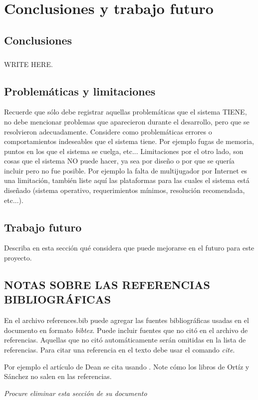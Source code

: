 \chapter{Conclusiones y trabajo futuro}
\section{Conclusiones}
\paragraph{}WRITE HERE.
\section{Problemáticas y limitaciones}
Recuerde que sólo debe registrar aquellas problemáticas que el sistema TIENE, no debe mencionar problemas que aparecieron durante el desarrollo, pero que se resolvieron adecuadamente.
Considere como problemáticas errores o comportamientos indeseables que el sistema tiene. Por ejemplo fugas de memoria, puntos en los que el sistema se cuelga, etc...
Limitaciones por el otro lado, son cosas que el sistema NO puede hacer, ya sea por diseño o por que se quería incluir pero no fue posible. Por ejemplo la falta de multijugador por Internet es una limitación, también liste aquí las plataformas para las cuales el sistema está diseñado (sistema operativo, requerimientos mínimos, resolución recomendada, etc...).

\section{Trabajo futuro}
Describa en esta sección qué considera que puede mejorarse en el futuro para este proyecto. 


\section{NOTAS SOBRE LAS REFERENCIAS BIBLIOGRÁFICAS}
En el archivo references.bib puede agregar las fuentes bibliográficas usadas en el documento en formato \emph{bibtex}.
Puede incluir fuentes que no citó en el archivo de referencias. Aquellas que no citó automáticamente serán omitidas en la lista de referencias.
Para citar una referencia en el texto debe usar el comando \emph{cite}. 

Por ejemplo el artículo de Dean se cita usando \cite{dean2003}. 
Note cómo los libros de Ortíz y Sánchez no salen en las referencias. 

\emph{Procure eliminar esta sección de su documento}

